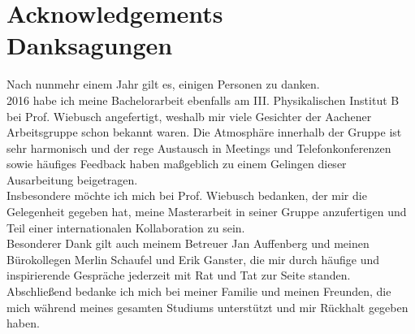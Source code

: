 \chapter{Acknowledgements\\Danksagungen}

Nach nunmehr einem Jahr gilt es, einigen Personen zu danken.\\

2016 habe ich meine Bachelorarbeit ebenfalls am III. Physikalischen Institut B bei Prof. Wiebusch angefertigt, weshalb mir viele Gesichter der Aachener \icecube Arbeitsgruppe schon bekannt waren. Die Atmosphäre innerhalb der Gruppe ist sehr harmonisch und der rege Austausch in Meetings und Telefonkonferenzen sowie häufiges Feedback haben maßgeblich zu einem Gelingen dieser Ausarbeitung beigetragen.\\

Insbesondere möchte ich mich bei Prof. Wiebusch bedanken, der mir die Gelegenheit gegeben hat, meine Masterarbeit in seiner Gruppe anzufertigen und Teil einer internationalen Kollaboration zu sein.\\

Besonderer Dank gilt auch meinem Betreuer Jan Auffenberg und meinen Bürokollegen Merlin Schaufel und Erik Ganster, die mir durch häufige und inspirierende Gespräche jederzeit mit Rat und Tat zur Seite standen.\\

Abschließend bedanke ich mich bei meiner Familie und meinen Freunden, die mich während meines gesamten Studiums unterstützt und mir Rückhalt gegeben haben.
